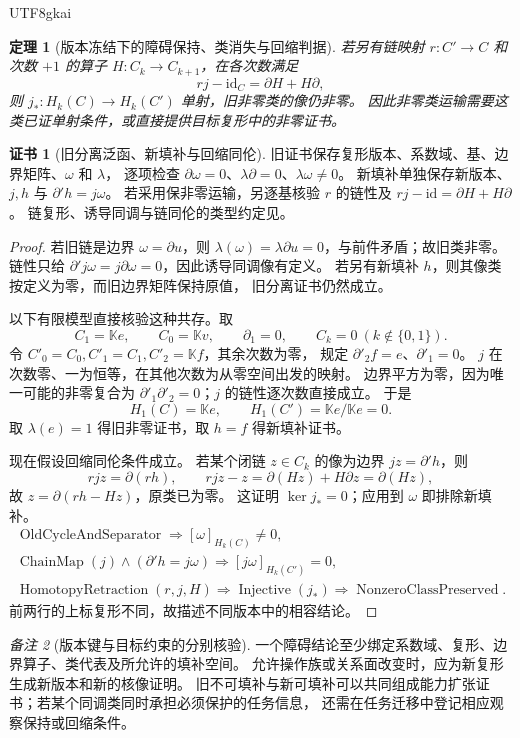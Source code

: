 \documentclass[12pt,a4paper,openany,notitlepage]{report}
\theoremstyle{plain}
\newtheorem{theorem}{定理}[chapter]
\theoremstyle{definition}
\newtheorem*{certificate}{证书}
\theoremstyle{remark}
\newtheorem{remark}[theorem]{备注}
\begin{document}
\begin{CJK*}{UTF8}{gkai}
\begin{theorem}[版本冻结下的障碍保持、类消失与回缩判据]
若另有链映射 $r:C'\to C$ 和次数 $+1$ 的算子
$H:C_k\to C_{k+1}$，在各次数满足
\[
 rj-\mathrm{id}_C=\partial H+H\partial,
\]
则 $j_*:H_k(C)\to H_k(C')$ 单射，旧非零类的像仍非零。
因此非零类运输需要这类已证单射条件，或直接提供目标复形中的非零证书。
\end{theorem}
\begin{certificate}[旧分离泛函、新填补与回缩同伦]
旧证书保存复形版本、系数域、基、边界矩阵、$\omega$ 和 $\lambda$，
逐项检查 $\partial\omega=0$、$\lambda\partial=0$、$\lambda\omega\ne0$。
新填补单独保存新版本、$j,h$ 与 $\partial'h=j\omega$。
若采用保非零运输，另逐基核验 $r$ 的链性及
$rj-\mathrm{id}=\partial H+H\partial$。
链复形、诱导同调与链同伦的类型约定见\cite{ExtHatcher,ExtWeibel,S38}。
\end{certificate}
\begin{proof}
若旧链是边界 $\omega=\partial u$，则
$\lambda(\omega)=\lambda\partial u=0$，与前件矛盾；故旧类非零。
链性只给 $\partial'j\omega=j\partial\omega=0$，因此诱导同调像有定义。
若另有新填补 $h$，则其像类按定义为零，而旧边界矩阵保持原值，
旧分离证书仍然成立。

以下有限模型直接核验这种共存。取
\[
 C_1=\mathbb K e,\qquad C_0=\mathbb K v,
 \qquad\partial_1=0,
 \qquad C_k=0\ (k\notin\{0,1\}).
\]
令 $C'_0=C_0,C'_1=C_1,C'_2=\mathbb K f$，其余次数为零，
规定 $\partial'_2f=e$、$\partial'_1=0$。
$j$ 在次数零、一为恒等，在其他次数为从零空间出发的映射。
边界平方为零，因为唯一可能的非零复合为
$\partial'_1\partial'_2=0$；$j$ 的链性逐次数直接成立。
于是
\[
 H_1(C)=\mathbb K e,\qquad
 H_1(C')=\mathbb K e/\mathbb K e=0.
\]
取 $\lambda(e)=1$ 得旧非零证书，取 $h=f$ 得新填补证书。

现在假设回缩同伦条件成立。
若某个闭链 $z\in C_k$ 的像为边界 $jz=\partial'h$，则
\[
 rjz=\partial(rh),\qquad
 rjz-z=\partial(Hz)+H\partial z=\partial(Hz),
\]
故 $z=\partial(rh-Hz)$，原类已为零。
这证明 $\ker j_*=0$；应用到 $\omega$ 即排除新填补。
\[
\begin{gathered}
 \operatorname{OldCycleAndSeparator}
 \Rightarrow [\omega]_{H_k(C)}\ne0,\\
 \operatorname{ChainMap}(j)\land(\partial'h=j\omega)
 \Rightarrow [j\omega]_{H_k(C')}=0,\\
 \operatorname{HomotopyRetraction}(r,j,H)
 \Rightarrow\operatorname{Injective}(j_*)
 \Rightarrow\operatorname{NonzeroClassPreserved}.
\end{gathered}
\]
前两行的上标复形不同，故描述不同版本中的相容结论。
\end{proof}

\begin{remark}[版本键与目标约束的分别核验]
一个障碍结论至少绑定系数域、复形、边界算子、类代表及所允许的填补空间。
允许操作族或关系面改变时，应为新复形生成新版本和新的核像证明。
旧不可填补与新可填补可以共同组成能力扩张证书；若某个同调类同时承担必须保护的任务信息，
还需在任务迁移中登记相应观察保持或回缩条件。
\end{remark}


\end{CJK*}
\end{document}
